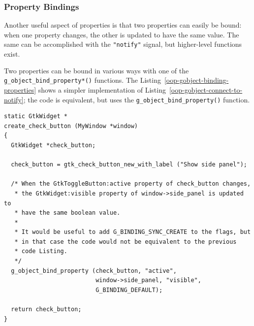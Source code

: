 \subsubsection{Property Bindings}

Another useful aspect of properties is that two properties can easily be bound: when one property changes, the other is updated to have the same value. The same can be accomplished with the \lstinline{"notify"} signal, but higher-level functions exist.

Two properties can be bound in various ways with one of the \lstinline{g_object_bind_property*()} functions. The Listing~\ref{oop-gobject-binding-properties} shows a simpler implementation of Listing~\ref{oop-gobject-connect-to-notify}; the code is equivalent, but uses the \lstinline{g_object_bind_property()} function.

\vspace{0.7cm}
\begin{lstlisting}[caption={Binding two properties.}, label=oop-gobject-binding-properties]
static GtkWidget *
create_check_button (MyWindow *window)
{
  GtkWidget *check_button;

  check_button = gtk_check_button_new_with_label ("Show side panel");

  /* When the GtkToggleButton:active property of check_button changes,
   * the GtkWidget:visible property of window->side_panel is updated to
   * have the same boolean value.
   *
   * It would be useful to add G_BINDING_SYNC_CREATE to the flags, but
   * in that case the code would not be equivalent to the previous
   * code Listing.
   */
  g_object_bind_property (check_button, "active",
                          window->side_panel, "visible",
                          G_BINDING_DEFAULT);

  return check_button;
}
\end{lstlisting}
